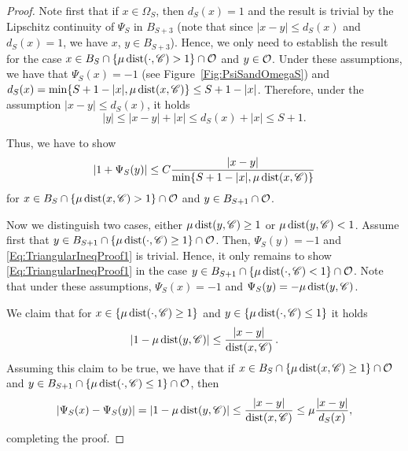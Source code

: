 \begin{proof}
Note first that if $x\in \Omega_S$, then $d_S(x)=1$ and the result is trivial by the Lipschitz continuity of $\Psi_S$ in $B_{S+3}$ (note that since $|x-y|\leq d_S(x)$ and $d_S(x) = 1$, we have $x$, $y\in B_{S+3}$). Hence, we only need to establish the result for the case $x\in B_S\cap \{\mu \operatorname{dist}(\cdot,\mathscr{C})> 1\} \cap \mathcal{O}$ and $y\in \mathcal{O}$. Under these assumptions, we have that $\Psi_S(x)=-1$ (see Figure~\ref{Fig:PsiSandOmegaS}) and $d_S(x) = \min\{S+1-|x|,\mu \operatorname{dist}(x,\mathscr{C})\} \leq S+1-|x|$. Therefore, under the assumption $|x-y|\leq d_S(x)$, it holds
$$
 |y|\leq |x-y| + |x| \leq d_S(x)+|x| \leq S+1. 
$$

Thus, we have to show
\begin{equation}
\label{Eq:TriangularIneqProof1}
	|1+\Psi_S(y)|\leq C\dfrac{|x-y|}{\min\{S+1-|x|,\mu \operatorname{dist}(x,\mathscr{C})\}}
\end{equation}
for $x\in B_S\cap \{\mu\operatorname{dist}(x,\mathscr{C})>1\} \cap \mathcal{O}$ and $y \in B_{S+1}\cap \mathcal{O}$.

Now we distinguish two cases, either $\mu\operatorname{dist}(y,\mathscr{C})\geq 1$ or $\mu \operatorname{dist}(y,\mathscr{C})< 1$. Assume first that $y\in B_{S+1} \cap \{\mu \operatorname{dist}(\cdot,\mathscr{C})\geq 1\}\cap \mathcal{O}$. Then, $\Psi_S(y)=-1$ and \eqref{Eq:TriangularIneqProof1} is trivial. Hence, it only remains to show \eqref{Eq:TriangularIneqProof1} in the case $y\in B_{S+1} \cap \{\mu \operatorname{dist}(\cdot,\mathscr{C}) < 1\}\cap \mathcal{O}$. Note that under these assumptions, $\Psi_S(x)=-1$ and $\Psi_S(y)=-\mu \operatorname{dist}(y,\mathscr{C})$. 

We claim that for $x \in \{\mu \operatorname{dist}(\cdot,\mathscr{C})\geq 1\}$ and $y \in \{\mu \operatorname{dist}(\cdot,\mathscr{C})\leq 1\}$ it holds
\begin{equation}
\label{Eq:TriangularIneqProof2}
|1-\mu \operatorname{dist}(y,\mathscr{C})|\leq \dfrac{|x-y|}{\operatorname{dist}(x,\mathscr{C})}\,.
\end{equation}
Assuming this claim to be true, we have that if $x\in B_S\cap \{\mu \operatorname{dist}(x,\mathscr{C})\geq 1\} \cap \mathcal{O}$ and $y\in B_{S+1} \cap \{\mu \operatorname{dist}(\cdot,\mathscr{C})\leq 1\}\cap \mathcal{O}$, then
$$ 
|\Psi_S(x)-\Psi_S(y)| = |1-\mu \operatorname{dist}(y,\mathscr{C})| \leq \frac{|x-y|}{\operatorname{dist}(x,\mathscr{C})} \leq  \mu \frac{|x-y|}{d_S(x)},
$$
completing the proof.


\end{proof}
